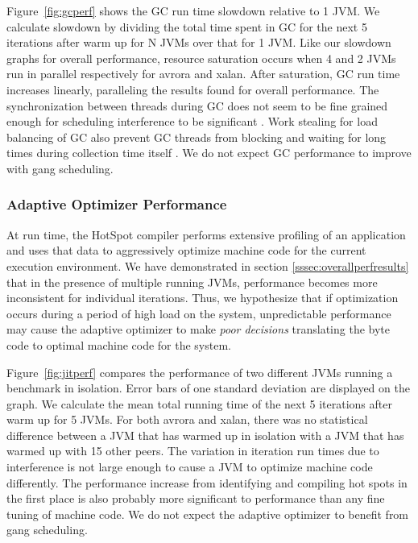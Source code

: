 \documentclass{sig-alternate}
\begin{document}
Figure~\ref{fig:gcperf} shows the GC run time slowdown relative to 1 JVM. We calculate slowdown by dividing the total time spent in GC for the next 5 iterations after warm up for N JVMs over that for 1 JVM. Like our slowdown graphs for overall performance, resource saturation occurs when 4 and 2 JVMs run in parallel respectively for avrora and xalan. After saturation, GC run time increases linearly, paralleling the results found for overall performance. The synchronization between threads during GC does not seem to be fine grained enough for scheduling interference to be significant \cite{feitelson1992gang}. Work stealing for load balancing of GC also prevent GC threads from blocking and waiting for long times during collection time itself \cite{stoptheworldgc}. We do not expect GC performance to improve with gang scheduling.

\begin{figure*}
\centering
{}
\caption{GC run time slowdown relative to 1 JVM.}
\label{fig:gcperf}
\end{figure*}

\subsubsection{Adaptive Optimizer Performance}
\begin{figure*}
\centering
{}
\caption{Mean total run time of JVMs warmed up in isolation and with 16 running JVMs in parallel.}
\label{fig:jitperf}
\end{figure*}
 
At run time, the HotSpot compiler performs extensive profiling of an application and uses that data to aggressively optimize machine code for the current execution environment\cite{hotspot:whitepaper}. We have demonstrated in section \ref{sssec:overallperfresults} that in the presence of multiple running JVMs, performance becomes more inconsistent for individual iterations. Thus, we hypothesize that if optimization occurs during a period of high load on the system, unpredictable performance may cause the adaptive optimizer to make \textit{poor decisions} translating the byte code to optimal machine code for the system.

Figure~\ref{fig:jitperf} compares the performance of two different JVMs running a benchmark in isolation. Error bars of one standard deviation are displayed on the graph. We calculate the mean total running time of the next 5 iterations after warm up for 5 JVMs. For both avrora and xalan, there was no statistical difference between a JVM that has warmed up in isolation with a JVM that has warmed up with 15 other peers. The variation in iteration run times due to interference is not large enough to cause a JVM to optimize machine code differently. The performance increase from identifying and compiling hot spots in the first place is also probably more significant to performance than any fine tuning of machine code. We do not expect the adaptive optimizer to benefit from gang scheduling.
\end{document}
